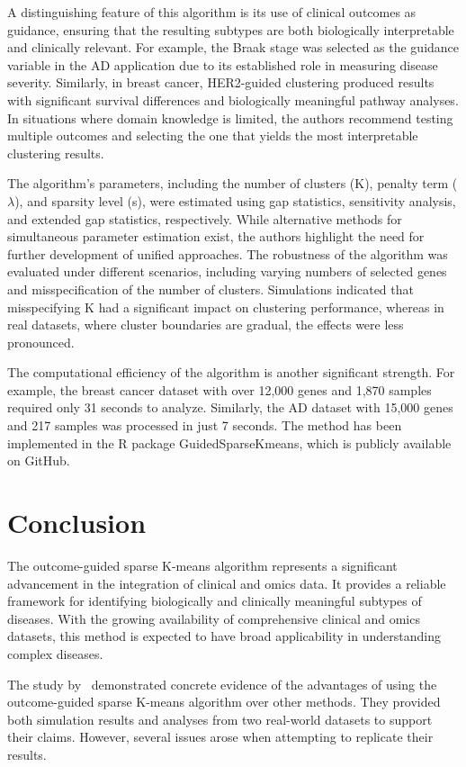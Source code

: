 \documentclass{statsoc}
\begin{document}
A distinguishing feature of this algorithm is its use of clinical outcomes as guidance, ensuring that the resulting subtypes are both biologically interpretable and clinically relevant. For example, the Braak stage was selected as the guidance variable in the AD application due to its established role in measuring disease severity. Similarly, in breast cancer, HER2-guided clustering produced results with significant survival differences and biologically meaningful pathway analyses. In situations where domain knowledge is limited, the authors recommend testing multiple outcomes and selecting the one that yields the most interpretable clustering results. 

The algorithm’s parameters, including the number of clusters (K), penalty term ($\lambda$), and sparsity level (s), were estimated using gap statistics, sensitivity analysis, and extended gap statistics, respectively. While alternative methods for simultaneous parameter estimation exist, the authors highlight the need for further development of unified approaches. The robustness of the algorithm was evaluated under different scenarios, including varying numbers of selected genes and misspecification of the number of clusters. Simulations indicated that misspecifying K had a significant impact on clustering performance, whereas in real datasets, where cluster boundaries are gradual, the effects were less pronounced.

The computational efficiency of the algorithm is another significant strength. For example, the breast cancer dataset with over 12,000 genes and 1,870 samples required only 31 seconds to analyze. Similarly, the AD dataset with 15,000 genes and 217 samples was processed in just 7 seconds. The method has been implemented in the R package GuidedSparseKmeans, which is publicly available on GitHub.

\section{Conclusion}

The outcome-guided sparse K-means algorithm represents a significant advancement in the integration of clinical and omics data. It provides a reliable framework for identifying biologically and clinically meaningful subtypes of diseases. With the growing availability of comprehensive clinical and omics datasets, this method is expected to have broad applicability in understanding complex diseases.

The study by~\cite{meng2022outcome} demonstrated concrete evidence of the advantages of using the outcome-guided sparse K-means algorithm over other methods. They provided both simulation results and analyses from two real-world datasets to support their claims. However, several issues arose when attempting to replicate their results.
\end{document}
